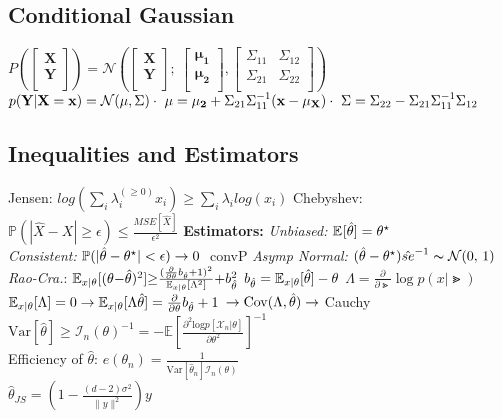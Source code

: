\subsection*{Conditional Gaussian}
$P(\begin{bmatrix}
\mathbf{X}\\
\mathbf{Y}\\
\end{bmatrix}){=}\mathcal{N}(\begin{bmatrix}
\mathbf{X}\\
\mathbf{Y}\\
\end{bmatrix}; \ \begin{bmatrix}
\mathbf{\mu_1}\\
\mathbf{\mu_2}\\
\end{bmatrix},\begin{bmatrix}
\Sigma_{11} & \Sigma_{12} \\
\Sigma_{21} & \Sigma_{22}\\
\end{bmatrix})$\\
 $p(\mathbf{Y}|\mathbf{X} = \mathbf{x}) = \mathcal{N}(\mu, \Sigma) \\
\cdot \  \mu =  \mathbf{\mu_2}+\Sigma_{21} \Sigma_{11}^{-1}(\mathbf{x}-\mathbf{\mu_X}) \\ 
\cdot \  \Sigma = \Sigma_{22}- \Sigma_{21} \Sigma_{11}^{-1} \Sigma_{12}$


\subsection*{Inequalities and Estimators}
Jensen: $log(\sum_{i} \lambda_i^{(\geq 0)} x_i) \geq \sum_{i} \lambda_i log(x_i)$
Chebyshev:$\mathbb{P}(|\hat{X}-X|\geq \epsilon)\leq \frac{MSE[\hat{X}]}{\epsilon^2}$
\textbf{Estimators:} \quad \textit{Unbiased:} $\E{\hat{\Gt}} = \Gts$ \\
\textit{Consistent:} $\P{|\hat{\Gt} - \Gts| < \epsilon}\rightarrow 0 \ \ $convP
\textit{Asymp Normal:} $(\hat{\Gt} - \Gts)\hat{se}^{-1} \sampled \NNormal $
\textit{Rao-Cra.}: 
$\E[x|\Gt]{(\Gt {-} \Gth)^2} {\geq} \frac{(\frac{\partial}{\partial \Gt}b_{\Gth}+1)^2}{\E[x|\Gt]{\Lambda^2}} {+} b_{\Gth}^2$
$b_{\Gth} = \E[x|\Gt]{\Gth} - \Gt$
$\Lambda = \frac{\partial}{\partial \Gt} \log p(x|\Gt)$
$\E[x|\Gt]{\Lambda} = 0 \rightarrow \E[x|\Gt]{\Lambda\Gth} = \frac{\partial}{\partial \Gt}b_{\Gth}+1$
$ \rightarrow \Cov(\Lambda,\Gth) \rightarrow$ Cauchy \\
$\mathrm{Var}[\hat{\theta}]\geq \mathcal{I}_n(\theta)^{-1} = -\mathbb{E}[\frac{\partial^2 \mathrm{log}p[\mathcal{X}_n|\theta]}{\partial \theta^2}]^{-1}$\\
Efficiency of $\hat{\theta}$: $e(\theta_n)=\frac{1}{\mathrm{Var}[\hat{\theta}_n]\mathcal{I}_n(\theta)}$\\
$\hat{\theta}_{JS} = \left( 1 - \frac{(d-2)\sigma^2}{\|y\|^2} \right) y$


